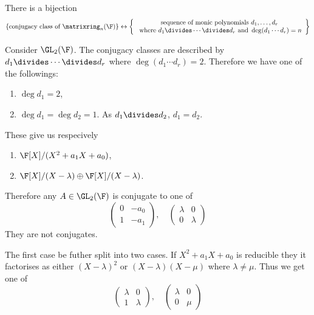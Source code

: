 \documentclass[a4paper]{article}
\begin{document}
\begin{corollary}
  There is a bijection
  \[
    \{\text{conjugacy class of } \matrixring_n(\F)\} \leftrightarrow
    \left\{
    \begin{array}[h]{c}
      \text{sequence of monic polynomials } d_1, \dots, d_r \\
      \text{ where } d_1 \divides \cdots \divides d_r \text{ and } \deg (d_1 \cdots d_r) = n
    \end{array}
  \right\}
  \]
\end{corollary}

\begin{eg}
  Consider \(\GL_2(\F)\). The conjugacy classes are described by \(d_1 \divides \cdots \divides d_r\) where \(\deg (d_1 \cdots d_r) = 2\). Therefore we have one of the followings:
  \begin{enumerate}
  \item \(\deg d_1 = 2\),
  \item \(\deg d_1 = \deg d_2 = 1\). As \(d_1 \divides d_2\), \(d_1 = d_2\).
  \end{enumerate}
  These give us respecively
  \begin{enumerate}
  \item \(\F[X]/(X^2 + a_1X + a_0)\),
  \item \(\F[X]/(X - \lambda) \oplus \F[X]/(X - \lambda)\).
  \end{enumerate}

  Therefore any \(A \in \GL_2(\F)\) is conjugate to one of
  \[
    \begin{pmatrix}
      0 & -a_0 \\
      1 & -a_1
    \end{pmatrix}
    ,\quad
    \begin{pmatrix}
      \lambda & 0 \\
      0 & \lambda
    \end{pmatrix}
  \]
  They are not conjugates.

  The first case be futher split into two cases. If \(X^2 + a_1X + a_0\) is reducible they it factorises as either \((X - \lambda)^2\) or \((X - \lambda)(X - \mu)\) where \(\lambda \neq \mu\). Thus we get one of
  \[
    \begin{pmatrix}
      \lambda & 0 \\
      1 & \lambda
    \end{pmatrix}
    ,\quad
    \begin{pmatrix}
      \lambda & 0 \\
      0 & \mu
    \end{pmatrix}
  \]
\end{eg}
\end{document}
